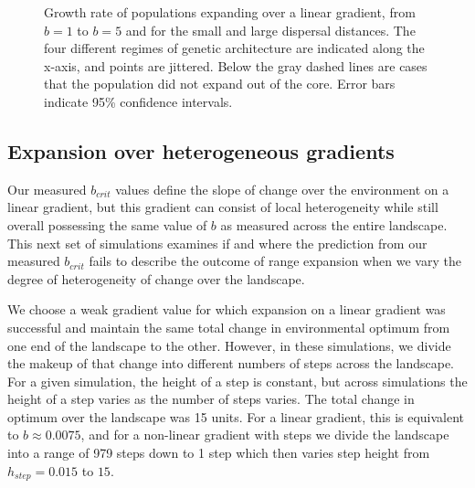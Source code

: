 \begin{figure}[h]
\centering
{}
\caption[Growth rate of populations expanding over a linear gradient.]{Growth rate of populations expanding over a linear gradient, from $b = 1$ to $b = 5$ and for the small and large dispersal distances. The four different regimes of genetic architecture are indicated along the x-axis, and points are jittered. Below the gray dashed lines are cases that the population did not expand out of the core. Error bars indicate 95\% confidence intervals.}
\label{fig:linearspeed}
\end{figure}



\subsection{Expansion over heterogeneous gradients}

Our measured $b_{crit}$ values define the slope of change over the environment on a linear gradient, but this gradient can consist of local heterogeneity while still overall possessing the same value of $b$ as measured across the entire landscape. This next set of simulations examines if and where the prediction from our measured $b_{crit}$ fails to describe the outcome of range expansion when we vary the degree of heterogeneity of change over the landscape. 

We choose a weak gradient value for which expansion on a linear gradient was successful and maintain the same total change in environmental optimum from one end of the landscape to the other. However, in these simulations, we divide the makeup of that change into different numbers of steps across the landscape. For a given simulation, the height of a step is constant, but across simulations the height of a step varies as the number of steps varies. The total change in optimum over the landscape was 15 units. For a linear gradient, this is equivalent to $b \approx 0.0075$, and for a non-linear gradient with steps we divide the landscape into a range of 979 steps down to 1 step which then varies step height from $h_{step} = 0.015$ to $15$. 

